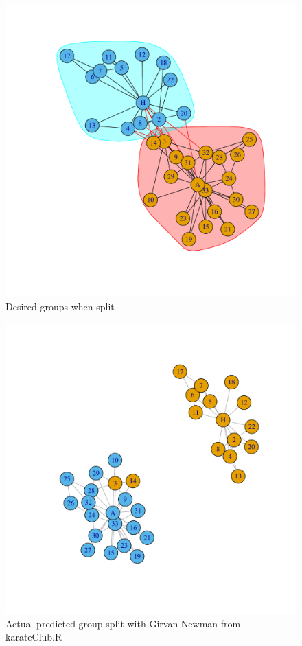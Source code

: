 \documentclass[letterpaper,11pt]{article}
\begin{document}
\begin{figure}[h]
\centering
\includegraphics[scale=0.6]{CommunitiesGraph.pdf}
\caption{Desired groups when split}
\label{fig:q1desired}
\end{figure}
\clearpage


\begin{figure}[h]
\centering
\includegraphics[scale=0.6]{predictedFinalGraph.pdf}
\caption{Actual predicted group split with Girvan-Newman from karateClub.R}
\label{fig:q1outcome}
\end{figure}
\end{document}
